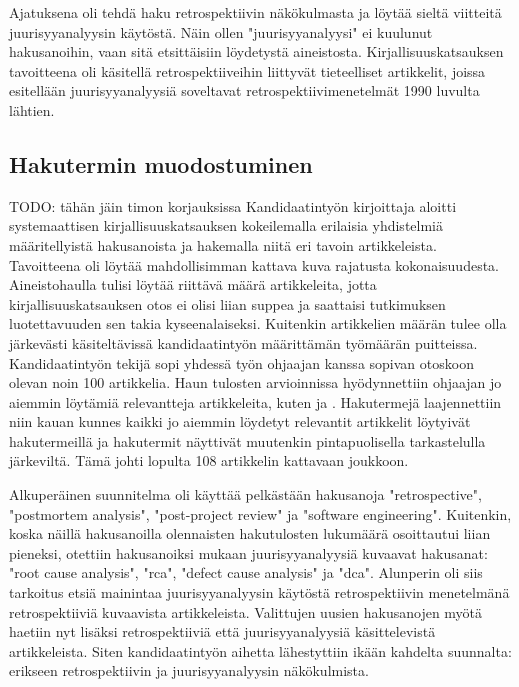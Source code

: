 Ajatuksena oli tehdä haku retrospektiivin näkökulmasta ja löytää sieltä viitteitä juurisyyanalyysin käytöstä. Näin ollen "juurisyyanalyysi" ei kuulunut hakusanoihin, vaan sitä etsittäisiin löydetystä aineistosta. Kirjallisuuskatsauksen tavoitteena oli käsitellä retrospektiiveihin liittyvät tieteelliset artikkelit, joissa esitellään juurisyyanalyysiä soveltavat retrospektiivimenetelmät 1990 luvulta lähtien.

\subsection{Hakutermin muodostuminen}
TODO: tähän jäin timon korjauksissa
Kandidaatintyön kirjoittaja aloitti systemaattisen kirjallisuuskatsauksen kokeilemalla erilaisia yhdistelmiä määritellyistä hakusanoista ja hakemalla niitä eri tavoin artikkeleista. Tavoitteena oli löytää mahdollisimman kattava kuva rajatusta kokonaisuudesta. Aineistohaulla tulisi löytää riittävä määrä artikkeleita, jotta kirjallisuuskatsauksen otos ei olisi liian suppea ja saattaisi tutkimuksen luotettavuuden sen takia kyseenalaiseksi. Kuitenkin artikkelien määrän tulee olla järkevästi käsiteltävissä kandidaatintyön määrittämän työmäärän puitteissa. Kandidaatintyön tekijä sopi yhdessä työn ohjaajan kanssa sopivan otoskoon olevan noin 100 artikkelia. Haun tulosten arvioinnissa hyödynnettiin ohjaajan jo aiemmin löytämiä relevantteja artikkeleita, kuten \citep{Bjornson2009} ja \citep{card1998learning}. Hakutermejä laajennettiin niin kauan kunnes kaikki jo aiemmin löydetyt relevantit artikkelit löytyivät hakutermeillä ja hakutermit näyttivät muutenkin pintapuolisella tarkastelulla järkeviltä. Tämä johti lopulta 108 artikkelin kattavaan joukkoon.

Alkuperäinen suunnitelma oli käyttää pelkästään hakusanoja "retrospective",  "postmortem analysis", "post-project review" ja "software engineering". Kuitenkin, koska näillä hakusanoilla olennaisten hakutulosten lukumäärä osoittautui liian pieneksi, otettiin hakusanoiksi mukaan juurisyyanalyysiä kuvaavat hakusanat: "root cause analysis", "rca", "defect cause analysis" ja "dca". Alunperin oli siis tarkoitus etsiä mainintaa juurisyyanalyysin käytöstä retrospektiivin menetelmänä retrospektiiviä kuvaavista artikkeleista. Valittujen uusien hakusanojen myötä haetiin nyt lisäksi retrospektiiviä että juurisyyanalyysiä käsittelevistä artikkeleista. Siten kandidaatintyön aihetta lähestyttiin ikään kahdelta suunnalta: erikseen retrospektiivin ja juurisyyanalyysin näkökulmista.


